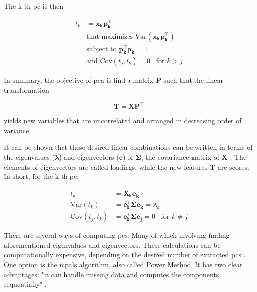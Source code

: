 The k-th \acrshort{pc} is then:

\begin{equation}
	\label{eqn:pca-pck}
	\begin{split}
		t_k & =\mathbf{x_k p_k^\intercal} \\
		& \text{that maximizes Var}(\mathbf{x_k p_k^\intercal}) \\
		& \text{subject to }  \mathbf{p_k^\intercal p_k} = 1 \\
		& \text{and } \text{Cov}(t_j, t_k) = 0 \;\;\; \text{for } k>j
	\end{split}
\end{equation}

In summary, the objective of \acrshort{pca} is find a matrix $\mathbf{P}$ such that the linear transformation

\begin{equation}
	\label{eqn:pca}
	\mathbf{T=XP^\intercal}
\end{equation}

yields new variables that are uncorrelated and arranged in decreasing order of variance.

It can be shown that these desired linear combinations can be written in terms of the eigenvalues ($\mathbf{\lambda}$) and eigenvectors ($\mathbf{e}$) of $\mathbf{\Sigma}$, the covariance matrix of $\mathbf{X}$ \parencite{johnson2013applied}. The elements of eigenvectors are called loadings, while the new features $\mathbf{T}$ are scores. In short, for the k-th \acrshort{pc}:

\begin{equation}
	\label{eqn:pca-eigen}
	\begin{split}
		t_k & =\mathbf{X_k e_k^\intercal} \\
		\text{Var}(t_k)& =  \mathbf{e_k^\intercal \Sigma e_k}=\lambda_k \\
		\text{Cov}(t_j, t_k)& = \mathbf{e_k^\intercal \Sigma e_j}= 0 \;\;\; \text{for } k\neq j
	\end{split}
\end{equation}

There are several ways of computing \acrshort{pc}s. Many of which involving finding aforementioned eigenvalues and eigenvectors. These calculations can be computationally expensive, depending on the desired number of extracted \acrshort{pc}s \parencite{bishop2006pattern}. One option is the \acrfull{nipals} algorithm, also called Power Method. It has two clear advantages: "it can handle missing data and computes the components sequentially" \parencite{dunn2021pid}.

